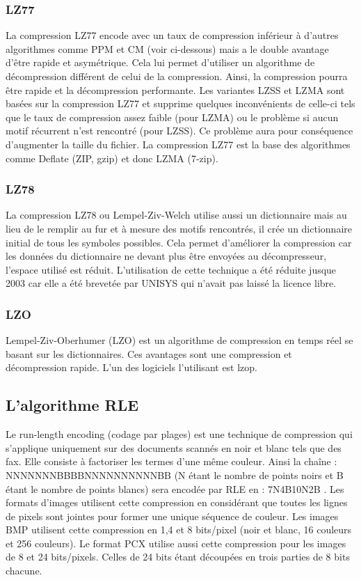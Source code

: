 \documentclass[a4paper]{report}
\begin{document}
	\subsubsection{LZ77}
		La compression LZ77 encode avec un taux de compression inférieur à d'autres algorithmes comme PPM et CM (voir ci-dessous) mais a le double avantage d'être rapide et asymétrique. Cela lui permet d'utiliser un algorithme de décompression différent de celui de la compression. Ainsi, la compression pourra être rapide et la décompression performante. Les variantes LZSS et LZMA sont basées sur la compression LZ77 et supprime quelques inconvénients de celle-ci tels que le taux de compression assez faible (pour LZMA) ou le problème si aucun motif récurrent n'est rencontré (pour LZSS). Ce problème aura pour conséquence d'augmenter la taille du fichier. La compression LZ77 est la base des algorithmes comme Deflate (ZIP, gzip) et donc LZMA (7-zip).
	\subsubsection{LZ78}
		La compression LZ78 ou Lempel-Ziv-Welch utilise aussi un dictionnaire mais au lieu de le remplir au fur et à mesure des motifs rencontrés, il crée un dictionnaire initial de tous les symboles possibles. Cela permet d'améliorer la compression car les données du dictionnaire ne devant plus être envoyées au décompresseur, l'espace utilisé est réduit. L'utilisation de cette technique a été réduite jusque 2003 car elle a été brevetée par UNISYS qui n'avait pas laissé la licence libre.
	\subsubsection{LZO}
		Lempel-Ziv-Oberhumer (LZO) est un algorithme de compression en temps réel se basant sur les dictionnaires. Ces avantages sont une compression et décompression rapide. L'un des logiciels l'utilisant est lzop.
	\subsection{L'algorithme RLE}
		Le run-length encoding (codage par plages) est une technique de compression qui s'applique uniquement sur des documents scannés en noir et blanc tels que des fax. Elle consiste à factoriser les termes d'une même couleur. Ainsi la chaîne : NNNNNNNBBBBNNNNNNNNNNBB (N étant le nombre de points noirs et B étant le nombre de points blancs) sera encodée par RLE en : 7N4B10N2B . Les formats d'images utilisent cette compression en considérant que toutes les lignes de pixels sont jointes pour former une unique séquence de couleur. Les images BMP utilisent cette compression en 1,4 et 8 bits/pixel (noir et blanc, 16 couleurs et 256 couleurs). Le format PCX utilise aussi cette compression pour les images de 8 et 24 bits/pixels. Celles de 24 bits étant découpées en trois parties de 8 bits chacune.
\end{document}

